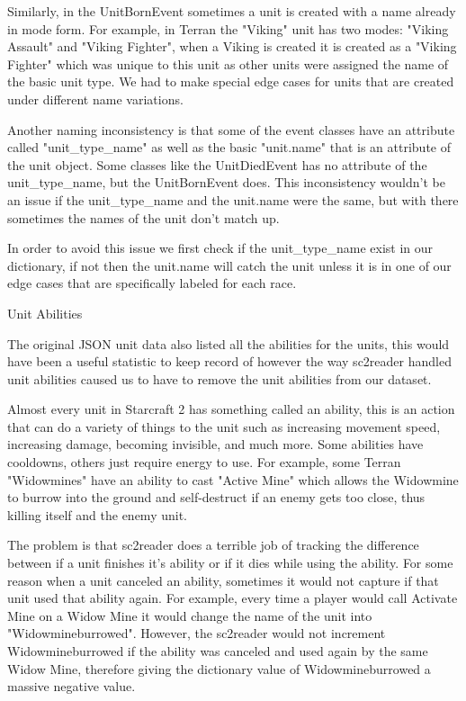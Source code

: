 \documentclass[a4paper,12pt]{report}
\begin{document}
Similarly, in the UnitBornEvent sometimes a unit is created with a name already in mode form. For example, in Terran the "Viking" unit has two modes: "Viking Assault" and "Viking Fighter", when a Viking is created it is created as a "Viking Fighter" which was unique to this unit as other units were assigned the name of the basic unit type. We had to make special edge cases for units that are created under different name variations. 

Another naming inconsistency is that some of the event classes have an attribute called "unit\_type\_name" as well as the basic "unit.name" that is an attribute of the unit object. Some classes like the UnitDiedEvent has no attribute of the unit\_type\_name, but the UnitBornEvent does. This inconsistency wouldn’t be an issue if the unit\_type\_name and the unit.name were the same, but with there sometimes the names of the unit don't match up.

In order to avoid this issue we first check if the unit\_type\_name exist in our dictionary, if not then the unit.name will catch the unit unless it is in one of our edge cases that are specifically labeled for each race.

Unit Abilities

The original JSON unit data also listed all the abilities for the units, this would have been a useful statistic to keep record of however the way sc2reader handled unit abilities caused us to have to remove the unit abilities from our dataset. 

Almost every unit in Starcraft 2 has something called an ability, this is an action that can do a variety of things to the unit such as increasing movement speed, increasing damage, becoming invisible, and much more. Some abilities have cooldowns, others just require energy to use. For example, some Terran "Widowmines" have an ability to cast "Active Mine" which allows the Widowmine to burrow into the ground and self-destruct if an enemy gets too close, thus killing itself and  the enemy unit.

The problem is that sc2reader does a terrible job of tracking the difference between if a unit finishes it’s ability or if it dies while using the ability. For some reason when a unit canceled an ability, sometimes it would not capture if that unit used that ability again. For example, every time a player would call Activate Mine on a Widow Mine it would change the name of the unit into "Widowmineburrowed". However, the sc2reader would not increment Widowmineburrowed if the ability was canceled and used again by the same Widow Mine, therefore giving the dictionary value of Widowmineburrowed a massive negative value.
\end{document}
